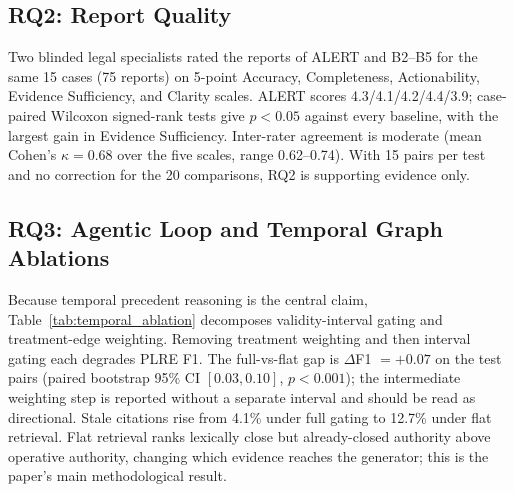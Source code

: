\subsection{RQ2: Report Quality}

Two blinded legal specialists rated the reports of ALERT and B2--B5 for the same 15 cases (75 reports) on 5-point Accuracy, Completeness, Actionability, Evidence Sufficiency, and Clarity scales. ALERT scores 4.3/4.1/4.2/4.4/3.9; case-paired Wilcoxon signed-rank tests give $p<0.05$ against every baseline, with the largest gain in Evidence Sufficiency. Inter-rater agreement is moderate (mean Cohen's $\kappa=0.68$ over the five scales, range 0.62--0.74). With 15 pairs per test and no correction for the 20 comparisons, RQ2 is supporting evidence only.

\subsection{RQ3: Agentic Loop and Temporal Graph Ablations}

Because temporal precedent reasoning is the central claim, Table~\ref{tab:temporal_ablation} decomposes validity-interval gating and treatment-edge weighting. Removing treatment weighting and then interval gating each degrades PLRE F1. The full-vs-flat gap is $\Delta$F1 ${=}{+}0.07$ on the test pairs (paired bootstrap 95\% CI $[0.03,0.10]$, $p{<}0.001$); the intermediate weighting step is reported without a separate interval and should be read as directional. Stale citations rise from 4.1\% under full gating to 12.7\% under flat retrieval. Flat retrieval ranks lexically close but already-closed authority above operative authority, changing which evidence reaches the generator; this is the paper's main methodological result.

\begin{table}[t]
\centering
\caption{Temporal precedent-graph ablation (main claim). Both mechanisms of Eq.~\eqref{eq:tpg_score} are removed in sequence; the bottom row recovers flat semantic similarity. Stale-cite measures citations to already-closed precedent ($t_q\!\ge\!e_v$).}
\label{tab:temporal_ablation}
\small
\setlength{\tabcolsep}{4pt}
\end{table}

